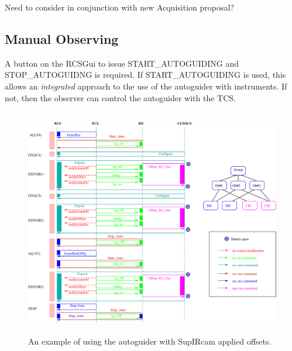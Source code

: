 \documentclass{article}
\begin{document}
Need to consider in conjunction with new Acquisition
proposal?

\subsection{Manual Observing}

A button on the RCSGui to issue START\_AUTOGUIDING
and STOP\_AUTOGUIDNG is required.  If START\_AUTOGUIDING
is used, this allows an \emph{integrated} approach to the
use of the autoguider with instruments.  If not,
then the observer can control the autoguider with the
TCS. 

\newpage

   \begin{figure}[h]
   \begin{center}
   \includegraphics[height=10cm]{iss_ag_case1.eps}
   \end{center}
   \label{fig:case1} 
   \caption[SupIRCam Use case.] 
   {An example of using the autoguider with SupIRcam applied offsets.}
   \end{figure} 
\end{document}
